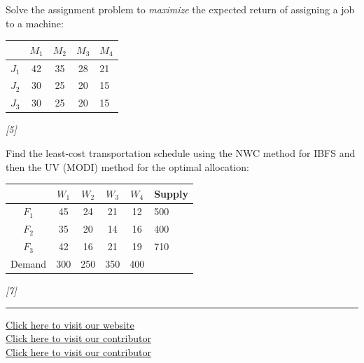 \documentclass[11pt,a4paper]{article}
\newcommand{\pts}[1]{\hfill   \textit{[#1]}}
\begin{document}
\begin{parts}
  \item Solve the assignment problem to   \textit{maximize} the expected return of assigning a job to a machine:
  
\begin{center}
  
\begin{tabular}{|cccc}
  \hline
   & $M_1$ & $M_2$ & $M_3$ & $M_4$ \\
  \hline
  $J_1$ & 42 & 35 & 28 & 21 \\
  $J_2$ & 30 & 25 & 20 & 15 \\
  $J_3$ & 30 & 25 & 20 & 15 \\
  \hline
  \end{tabular}
  \end{center} \pts{5}
  \item Find the least-cost transportation schedule using the NWC method for IBFS and then the UV (MODI) method for the optimal allocation:
  
\begin{center}
  
\begin{tabular}{|cccc|c}
  \hline
   & $W_1$ & $W_2$ & $W_3$ & $W_4$ & Supply \\
  \hline
  $F_1$ & 45 & 24 & 21 & 12 & 500 \\
  $F_2$ & 35 & 20 & 14 & 16 & 400 \\
  $F_3$ & 42 & 16 & 21 & 19 & 710 \\
  \hline
  Demand & 300 & 250 & 350 & 400 & \\
  \hline
  \end{tabular}
  \end{center} \pts{7}
\end{parts}

\vfill\rule{\linewidth}{0.4pt}

\begin{center}\small
  \href{https://bhu-exam.vercel.app/}{Click here to visit our website}\\[4pt]
  \href{https://me-aryan.vercel.app/}{Click here to visit our contributor}\\[4pt]
  \href{https://quashan-me.vercel.app/}{Click here to visit our contributor}
\end{center}
\end{document}
